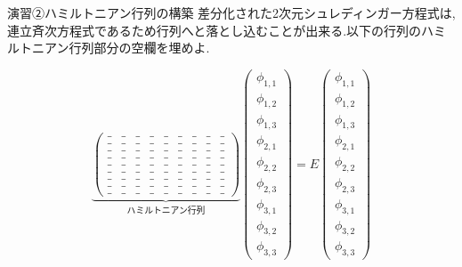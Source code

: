 \documentclass{beamer}
\begin{document}
\begin{frame}{演習②\quad ハミルトニアン行列の構築}
      \setlength{\leftskip}{-1.5em}   %
    \setlength{\rightskip}{-1.5em}
    差分化された2次元シュレディンガー方程式は,連立斉次方程式であるため行列へと落とし込むことが出来る.以下の行列のハミルトニアン行列部分の空欄を埋めよ.
    \vspace{0.5em}
    
    \begin{minipage}{0.5\textwidth}
    \scriptsize
    $$
    \underbrace{
    \begin{pmatrix}
    \_ & \_ & \_ & \_ & \_ & \_ & \_ & \_ & \_ \\
    \_ & \_ & \_ & \_ & \_ & \_ & \_ & \_ & \_ \\
    \_ & \_ & \_ & \_ & \_ & \_ & \_ & \_ & \_ \\
    \hline
    \_ & \_ & \_ & \_ & \_ & \_ & \_ & \_ & \_ \\
    \_ & \_ & \_ & \_ & \_ & \_ & \_ & \_ & \_ \\
    \_ & \_ & \_ & \_ & \_ & \_ & \_ & \_ & \_ \\
    \hline
    \_ & \_ & \_ & \_ & \_ & \_ & \_ & \_ & \_ \\
    \_ & \_ & \_ & \_ & \_ & \_ & \_ & \_ & \_ \\
    \_ & \_ & \_ & \_ & \_ & \_ & \_ & \_ & \_ 
    \end{pmatrix}
    }_{\text{ハミルトニアン行列}}
    \begin{pmatrix}
    \phi_{1,1} \\ \phi_{1,2} \\ \phi_{1,3} \\
    \hline
    \phi_{2,1} \\ \phi_{2,2} \\ \phi_{2,3} \\
    \hline
    \phi_{3,1} \\ \phi_{3,2} \\ \phi_{3,3}
    \end{pmatrix}
    =
    E
    \begin{pmatrix}
    \phi_{1,1} \\ \phi_{1,2} \\ \phi_{1,3} \\
    \hline
    \phi_{2,1} \\ \phi_{2,2} \\ \phi_{2,3} \\
    \hline
    \phi_{3,1} \\ \phi_{3,2} \\ \phi_{3,3}

\end{pmatrix}$$
\end{minipage}
\end{frame}
\end{document}
